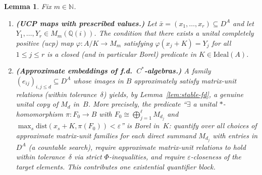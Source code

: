 \documentclass[12pt,fleqn,a4paper]{amsart}
\renewcommand{\le}{\leqslant}
\numberwithin{equation}{section}
\newtheorem{lemma}[theorem]{Lemma}
\theoremstyle{definition}
\newcommand{\N}{\mathbb{N}}
\newcommand{\Q}{\mathbb{Q}}
\newcommand{\Ideal}{\mathrm{Ideal}}
\newcommand{\dist}{\mathrm{dist}}
\begin{document}
\begin{lemma}
\label{lem:ucp-fd}
Fix $m\in\N$.
\begin{enumerate}
\item \textbf{(UCP maps with prescribed values.)}
Let $\bar x=(x_1,\dots,x_r)\subseteq D^A$ and let $Y_1, \dots, Y_r \in M_m(\Q(i))$.
The condition that there exists a unital completely positive (ucp) map
$\varphi:A/K\to M_m$ satisfying $\varphi(x_j+K)=Y_j$ for all $1\le j\le r$
is a \emph{closed} (and in particular Borel) predicate in $K \in \Ideal(A)$.

\item \textbf{(Approximate embeddings of f.d.\ $C^*$-algebras.)}
A family $(e_{ij})_{i,j\le d}\subseteq D^A$ whose images in $B$
\emph{approximately} satisfy matrix-unit relations (within tolerance~$\delta$) yields,
by Lemma~\ref{lem:stable-fd}, a genuine unital copy of $M_d$ in~$B$.
More precisely, the predicate ``$\exists$ a unital $*$-homo\-morphism
$\pi:F_0\to B$ with $F_0\cong\bigoplus_{j=1}^\ell M_{d_j}$ and
$\max_s\dist(x_s+K,\pi(F_0))<\varepsilon$'' is Borel in~$K$:
quantify over all choices of approximate matrix-unit families for each direct summand
$M_{d_j}$ with entries in $D^A$ (a countable search), require approximate matrix-unit
relations to hold within tolerance~$\delta$ via strict $\Phi$-inequalities, and require
$\varepsilon$-closeness of the target elements.  This contributes one existential
quantifier block.
\end{enumerate}
\end{lemma}
\end{document}
